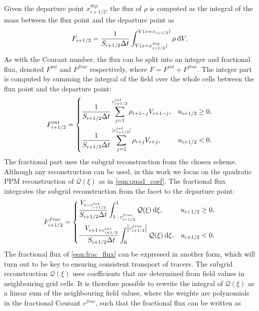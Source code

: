 \documentclass{ametsocV6.1}
\newcommand{\dx}[1]{\hspace{0.75mm}\mathrm{d}{#1}}
\begin{document}
Given the departure point $x^{dep}_{i+1/2}$, the flux of $\rho$ is computed as the integral of the mass between the flux point and the departure point as
\begin{equation}
F_{i+1/2} = 
\frac{1}{S_{i+1/2}\Delta{t}} \int^{V(x=x_{i+1/2})}_{V(x=x^{dep}_{i+1/2})} \rho \dx{V}.  
\end{equation}
As with the Courant number, the flux can be split into an integer and fractional flux, denoted $F^{int}$ and $F^{frac}$ respectively, where $F = F^{int} + F^{frac}$.
The integer part is computed by summing the integral of the field over the whole cells between the flux point and the departure point:
\begin{equation}
    F^{int}_{i+1/2} = 
    \begin{dcases}
        \frac{1}{S_{i+1/2}\Delta{t}}\sum_{j=1}^{c_{i+1/2}^{int}} \rho_{i+1-j} V_{i+1-j}, & u_{i+1/2} \geq 0, \\
        \frac{1}{S_{i+1/2}\Delta{t}}\sum_{j=1}^{|c_{i+1/2}^{int}|} \rho_{i+j} V_{i+j}, & u_{i+1/2} < 0.
    \end{dcases}
\end{equation}
The fractional part uses the subgrid reconstruction from the chosen scheme.
Although any reconstruction can be used, in this work we focus on the quadratic PPM reconstruction of $\mathcal{Q}(\xi)$ as in \eqref{eqn:quad_coef}. The fractional flux integrates the subgrid reconstruction from the facet to the departure point:
\begin{equation} \label{eqn:frac_flux}
    F^{frac}_{i+1/2} = 
    \begin{dcases}
        \frac{V_{i-c^{int}_{i+1/2}}}{S_{i+1/2}\Delta t} \int^{1}_{1-c_{i+1/2}^{frac}} \mathcal{Q}(\xi) \dx{\xi}, & u_{i+1/2} \ge 0, \\
        -\frac{V_{i+1+c^{int}_{i+1/2}}}{S_{i+1/2}\Delta t} \int^{\left| c_{i+1/2}^{frac}\right|}_{0} \mathcal{Q}(\xi) \dx{\xi}, & u_{i+1/2} < 0.  
    \end{dcases}
\end{equation}
The fractional flux of \eqref{eqn:frac_flux} can be expressed in another form, which will turn out to be key to ensuring consistent transport of tracers. 
The subgrid reconstruction $\mathcal{Q}(\xi)$ uses coefficients that are determined from field values in neighbouring grid cells.
It is therefore possible to rewrite the integral of $\mathcal{Q}(\xi)$ as a linear sum of the neighbouring field values, where the weights are polynomials in the fractional Courant $c^{frac}$, such that the fractional flux can be written as
\end{document}
